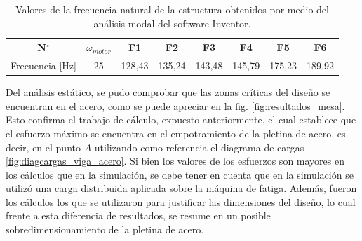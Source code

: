 \begin{table}[h]
\centering
\begin{tabular}{@{}cccccccc@{}}
\toprule
N$^{\circ}$ &  $\omega_{motor}$ & F1 & F2 & F3 & F4 & F5 & F6  \\ \midrule
Frecuencia [Hz] & 25 & 128,43 & 135,24 & 143,48 & 145,79 & 175,23 & 189,92 \\ \bottomrule
\end{tabular} 
\caption{Valores de la frecuencia natural de la estructura obtenidos por medio del análisis modal del software Inventor. }
\label{tab:frec_nat}
\end{table}

Del análisis estático, se pudo comprobar que las zonas críticas del diseño se encuentran en el acero, como se puede apreciar en la fig. \ref{fig:resultados_mesa}. Esto confirma el trabajo de cálculo, expuesto anteriormente, el cual establece que el esfuerzo máximo se encuentra en el empotramiento de la pletina de acero, es decir, en el punto $A$ utilizando como referencia el diagrama de cargas \ref{fig:diagcargas_viga_acero}. Si bien los valores de los esfuerzos son mayores en los cálculos que en la simulación, se debe tener en cuenta que en la simulación se utilizó una carga distribuida aplicada sobre la máquina de fatiga. Además, fueron los cálculos los que se utilizaron para justificar las dimensiones del diseño, lo cual frente a esta diferencia de resultados, se resume en un posible sobredimensionamiento de la pletina de acero.

